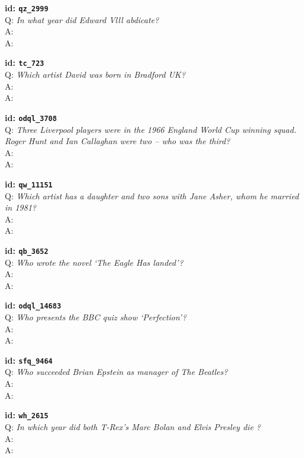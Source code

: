\tiny{\setlength{\parindent}{0cm}
\textbf{id: \texttt{qz\_2999}} \\
Q: \textit{In what year did Edward Vlll abdicate?} \\
A:  \\
A: }

\tiny{\setlength{\parindent}{0cm}
\textbf{id: \texttt{tc\_723}} \\
Q: \textit{Which artist David was born in Bradford UK?} \\
A:  \\
A: }

\tiny{\setlength{\parindent}{0cm}
\textbf{id: \texttt{odql\_3708}} \\
Q: \textit{Three Liverpool players were in the 1966 England World Cup winning squad. Roger Hunt and Ian Callaghan were two – who was the third?} \\
A:  \\
A: }

\tiny{\setlength{\parindent}{0cm}
\textbf{id: \texttt{qw\_11151}} \\
Q: \textit{Which artist has a daughter and two sons with Jane Asher, whom he married in 1981?} \\
A:  \\
A: }

\tiny{\setlength{\parindent}{0cm}
\textbf{id: \texttt{qb\_3652}} \\
Q: \textit{Who wrote the novel ‘The Eagle Has landed’?} \\
A:  \\
A: }

\tiny{\setlength{\parindent}{0cm}
\textbf{id: \texttt{odql\_14683}} \\
Q: \textit{Who presents the BBC quiz show ‘Perfection’?} \\
A:  \\
A: }

\tiny{\setlength{\parindent}{0cm}
\textbf{id: \texttt{sfq\_9464}} \\
Q: \textit{Who succeeded Brian Epstein as manager of The Beatles?} \\
A:  \\
A: }

\tiny{\setlength{\parindent}{0cm}
\textbf{id: \texttt{wh\_2615}} \\
Q: \textit{In which year did both T-Rex's Marc Bolan and Elvis Presley die ?} \\
A:  \\
A: }

